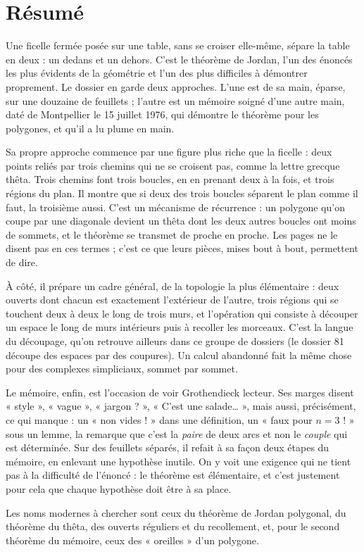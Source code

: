 \documentclass[11pt,a4paper]{article}
\begin{document}
\section*{Résumé}

\begin{resume}
Une ficelle fermée posée sur une table, sans se croiser elle-même, sépare la
table en deux : un dedans et un dehors. C'est le théorème de Jordan, l'un des
énoncés les plus évidents de la géométrie et l'un des plus difficiles à
démontrer proprement. Le dossier en garde deux approches. L'une est de sa
main, éparse, sur une douzaine de feuillets ; l'autre est un mémoire soigné
d'une autre main, daté de Montpellier le 15 juillet 1976, qui démontre le
théorème pour les polygones, et qu'il a lu plume en main.

Sa propre approche commence par une figure plus riche que la ficelle : deux
points reliés par trois chemins qui ne se croisent pas, comme la lettre grecque
thêta. Trois chemins font trois boucles, en en prenant deux à la fois, et trois
régions du plan. Il montre que si deux des trois boucles séparent le plan
comme il faut, la troisième aussi. C'est un mécanisme de récurrence : un
polygone qu'on coupe par une diagonale devient un thêta dont les deux autres
boucles ont moins de sommets, et le théorème se transmet de proche en proche.
Les pages ne le disent pas en ces termes ; c'est ce que leurs pièces, mises
bout à bout, permettent de dire.

À côté, il prépare un cadre général, de la topologie la plus élémentaire : deux
ouverts dont chacun est exactement l'extérieur de l'autre, trois régions qui se
touchent deux à deux le long de trois murs, et l'opération qui consiste à
découper un espace le long de murs intérieurs puis à recoller les morceaux.
C'est la langue du découpage, qu'on retrouve ailleurs dans ce groupe de
dossiers (le dossier 81 découpe des espaces par des coupures). Un calcul
abandonné fait la même chose pour des complexes simpliciaux, sommet par
sommet.

Le mémoire, enfin, est l'occasion de voir Grothendieck lecteur. Ses marges
disent « style », « vague », « jargon ? », « C'est une salade… », mais aussi,
précisément, ce qui manque : un « non vides ! » dans une définition, un
« faux pour $n = 3$ ! » sous un lemme, la remarque que c'est la \emph{paire}
de deux arcs et non le \emph{couple} qui est déterminée. Sur des feuillets
séparés, il refait à sa façon deux étapes du mémoire, en enlevant une
hypothèse inutile. On y voit une exigence qui ne tient pas à la difficulté de
l'énoncé : le théorème est élémentaire, et c'est justement pour cela que chaque
hypothèse doit être à sa place.

Les noms modernes à chercher sont ceux du théorème de Jordan polygonal, du
théorème du thêta, des ouverts réguliers et du recollement, et, pour le second
théorème du mémoire, ceux des « oreilles » d'un polygone.

\end{resume}
\end{document}
